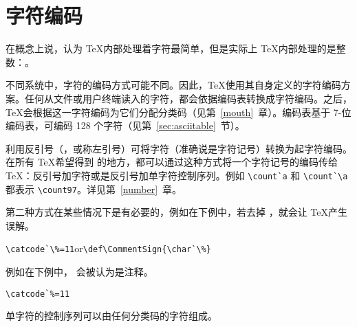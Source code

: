 \documentclass{book}
\begin{document}
\section{字符编码}
\label{char:code}

在概念上说，认为 \TeX 内部处理着字符最简单，但是实际上 \TeX 内部处理的是整数：。

不同系统中，字符的编码方式可能不同。因此，\TeX 使用其自身定义的字符编码方案。任何从文件或用户终端读入的字符，都会依据编码表转换成字符编码。之后，\TeX 会根据这一字符编码为它们分配分类码（见第~\ref{mouth}~章）。编码表基于 7-位 \ascii 编码表，可编码 128 个字符（见第~\ref{sec:asciitable}~节）。

利用反引号（，或称左引号）可将字符（准确说是字符记号）转换为起字符编码。在所有 \TeX 希望得到  的地方，都可以通过这种方式将一个字符记号的编码传给 \TeX：反引号加字符或是反引号加单字符控制序列。例如 \verb.\count`a. 和 \verb.\count`\a. 都表示 \verb.\count97.。详见第~\ref{number}~章。

第二种方式在某些情况下是有必要的，例如在下例中，若去掉 \cs{}，就会让 \TeX 产生误解。
\begin{disp}\verb>\catcode`\%=11>\quad or\quad \verb>\def\CommentSign{\char`\%}>\end{disp}
例如在下例中， 会被认为是注释。
\begin{verbatim}
\catcode`%=11
\end{verbatim}
单字符的控制序列可以由任何分类码的字符组成。
\end{document}
